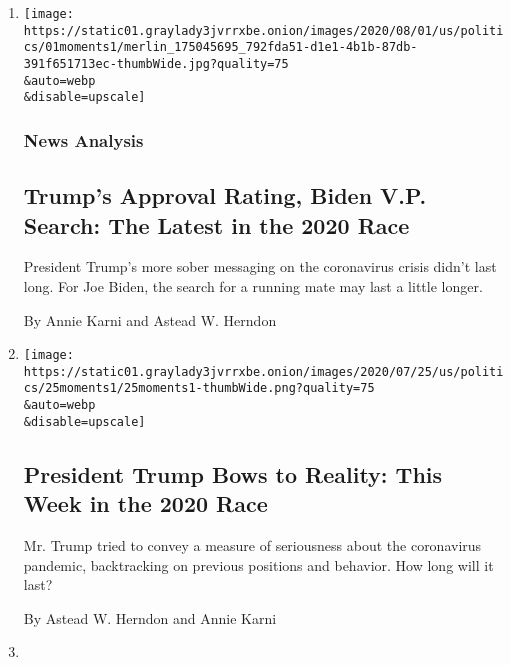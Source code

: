 \begin{enumerate}
\def\labelenumi{\arabic{enumi}.}
\item
  \href{/2020/08/01/us/politics/trump-biden-polls-vp.html}{}

  \texttt{[image: https://static01.graylady3jvrrxbe.onion/images/2020/08/01/us/politics/01moments1/merlin\_175045695\_792fda51-d1e1-4b1b-87db-391f651713ec-thumbWide.jpg?quality=75\\\&auto=webp\\\&disable=upscale]}

  \hypertarget{news-analysis}{%
  \subsubsection{News Analysis}\label{news-analysis}}

  \hypertarget{trumps-approval-rating-biden-vp-search-the-latest-in-the-2020-race}{%
  \subsection{Trump's Approval Rating, Biden V.P. Search: The Latest in
  the 2020
  Race}\label{trumps-approval-rating-biden-vp-search-the-latest-in-the-2020-race}}

  President Trump's more sober messaging on the coronavirus crisis
  didn't last long. For Joe Biden, the search for a running mate may
  last a little longer.

  By Annie Karni and Astead W. Herndon
\item
  \href{/2020/07/25/us/politics/trump-biden-polls-coronavirus.html}{}

  \texttt{[image: https://static01.graylady3jvrrxbe.onion/images/2020/07/25/us/politics/25moments1/25moments1-thumbWide.png?quality=75\\\&auto=webp\\\&disable=upscale]}

  \hypertarget{president-trump-bows-to-reality-this-week-in-the-2020-race}{%
  \subsection{President Trump Bows to Reality: This Week in the 2020
  Race}\label{president-trump-bows-to-reality-this-week-in-the-2020-race}}

  Mr. Trump tried to convey a measure of seriousness about the
  coronavirus pandemic, backtracking on previous positions and behavior.
  How long will it last?

  By Astead W. Herndon and Annie Karni
\item
  \href{/2020/07/23/us/politics/barack-obama-joe-biden-video.html}{}


\end{enumerate}
